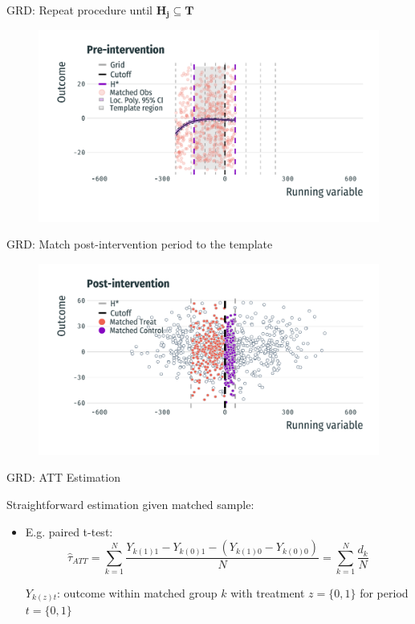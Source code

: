 \documentclass[usenames,dvipsnames,11pt,aspectratio=169]{beamer}
\begin{document}
\begin{frame}{GRD: Repeat procedure until $\mathbf{H_j} \boldsymbol{\subseteq} \mathbf{T}$}
\begin{figure}[!htb]
\centering
   \includegraphics[width=\textwidth]{figures/pre9.pdf}
\end{figure}
\end{frame}

\begin{frame}{GRD: Match post-intervention period to the template}
\begin{figure}[!htb]
\centering
   \includegraphics[width=\textwidth]{figures/pre10.pdf}
\end{figure}
\end{frame}


\begin{frame}{GRD: ATT Estimation}

Straightforward estimation given matched sample:

\begin{itemize}
    \item E.g. paired t-test:
    $$\hat{\tau}_{ATT} = \sum_{k=1}^N\frac{Y_{k(1)1} - Y_{k(0)1} - (Y_{k(1)0}-Y_{k(0)0})}{N} = \sum_{k=1}^N\frac{d_k}{N}$$
    
    $Y_{k(z)t}$: outcome within matched group $k$ with treatment $z=\{0,1\}$ for period $t=\{0,1\}$
    
    
\end{itemize}
\end{frame}
\end{document}
